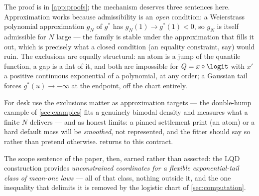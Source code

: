The proof is in \cref{app:proofs}; the mechanism deserves three sentences
here.  Approximation works because admissibility is an \emph{open}
condition: a Weierstrass polynomial approximation $g_N$ of $g^{\ast}$ has
$g_N(1)\to g^{\ast}(1)<0$, so $g_N$ is itself admissible for $N$ large ---
the family is stable under the approximation that fills it out, which is
precisely what a closed condition (an equality constraint, say) would
ruin.  The exclusions are equally structural: an atom is a jump of the
quantile function, a gap is a flat of it, and both are impossible for
$Q=x\circ\logit$ with $x'$ a positive continuous exponential of a
polynomial, at any order; a Gaussian tail forces $g^{\ast}(u)\to-\infty$
at the endpoint, off the chart entirely.

For desk use the exclusions matter as approximation targets --- the
double-hump example of \cref{sec:examples} fits a genuinely bimodal
density and measures what a finite $N$ delivers --- and as honest limits:
a pinned settlement print (an atom) or a hard default mass will be
\emph{smoothed}, not represented, and the fitter should say so rather than
pretend otherwise.   returns to this contract.

The scope sentence of the paper, then, earned rather than asserted: the
LQD construction provides \emph{unconstrained coordinates for a flexible
exponential-tail class of mean-one laws} --- all of that class, nothing
outside it, and the one inequality that delimits it is removed by the
logistic chart of \cref{sec:computation}.
